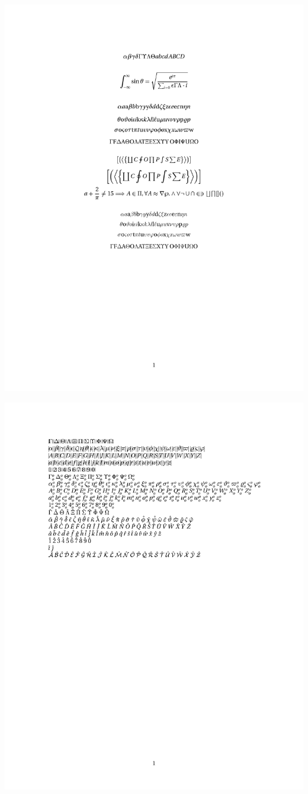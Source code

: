 \documentclass[twocolumn]{article}
\begin{document}
 \noindent\includegraphics*{../results/utopia-font}\par
{} \noindent\includegraphics*{../results/utopia-pos}\par
\end{document}
